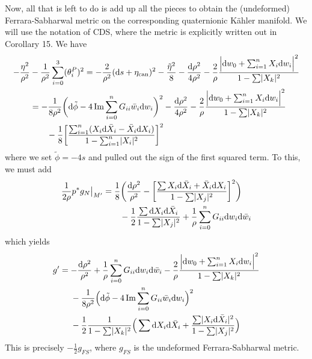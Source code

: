 \documentclass[parskip=half]{scrartcl}
\begin{document}
Now, all that is left to do is add up all the pieces to obtain the (undeformed) Ferrara-Sabharwal metric on the corresponding quaternionic K\"ahler manifold. We will use the notation of CDS, where the metric is explicitly written out in Corollary 15. We have
\begin{align*}
	-\frac{\eta^2}{\rho^2}&-\frac{1}{\rho^2}\sum_{i=0}^3(\theta_i^P)^2
	=-\frac{2}{\rho^2}(\mathrm{d} s+\eta_\text{can})^2-\frac{\tilde\eta^2}{8}-\frac{\mathrm{d} \rho^2}{4\rho^2}
	-\frac{2}{\rho}\frac{\Big|\mathrm{d} w_0 + \sum_{i=1}^n X_i \mathrm{d} w_i\Big|^2}{1-\sum \lvert X_k \rvert^2}\\
	&=-\frac{1}{8\rho^2}\bigg(\mathrm{d} \tilde\phi-4\operatorname{Im} \sum_{i=0}^n G_{ii} \bar w_i \mathrm{d} w_i\bigg)^2
	-\frac{\mathrm{d} \rho^2}{4\rho^2}
	- \frac{2}{\rho}\frac{\Big|\mathrm{d} w_0 + \sum_{i=1}^n X_i \mathrm{d} w_i\Big|^2}{1-\sum \lvert X_k \rvert^2}\\
	&\qquad -\frac{1}{8}\bigg[\frac{\sum_{i=1}^n(X_i \mathrm{d} \bar X_i - \bar X_i \mathrm{d} X_i)}{1-\sum_{i=1}^n\lvert X_i \rvert^2}	\bigg]^2
\end{align*}
where we set $\tilde\phi=-4s$ and pulled out the sign of the first squared term. To this, we must add
\begin{align*}
	\frac{1}{2\rho}p^*g_N\big|_{M'}
	&=\frac{1}{8}\bigg(\frac{\mathrm{d} \rho^2}{\rho^2}
	-\bigg[\frac{\sum X_i \mathrm{d} \bar X_i + \bar X_i \mathrm{d} X_i}{1-\sum \lvert X_j \rvert^2}\bigg]^2\bigg)\\
	&\qquad -\frac{1}{2}\frac{\sum \mathrm{d} X_i \mathrm{d} \bar X_i}{1-\sum \lvert X_j \rvert^2}
	+\frac{1}{\rho}\sum_{i=0}^n G_{ii}\mathrm{d} w_i \mathrm{d} \bar w_i
\end{align*}
which yields
\begin{align*}
	g'&=-\frac{\mathrm{d} \rho^2}{\rho^2}+\frac{1}{\rho}\sum_{i=0}^n G_{ii} \mathrm{d} w_i \mathrm{d} \bar w_i 
	-\frac{2}{\rho}\frac{\Big|\mathrm{d} w_0 + \sum_{i=1}^n X_i \mathrm{d} w_i\Big|^2}{1-\sum \lvert X_k \rvert^2}\\
	&\quad\ -\frac{1}{8\rho^2}\Big(\mathrm{d} \tilde\phi-4\operatorname{Im} \sum_{i=0}^n G_{ii} \bar w_i \mathrm{d} w_i\Big)^2\\
	&\quad\ -\frac{1}{2}\frac{1}{1-\sum \lvert X_k \rvert^2}\Big(\sum \mathrm{d} X_i \mathrm{d} \bar X_i
	+\frac{\sum\lvert X_i \mathrm{d} \bar X_i \rvert^2}{1-\sum \lvert X_j \rvert^2}\Big)
\end{align*}
This is precisely $-\frac{1}{2}g_{FS}$, where $g_{FS}$ is the undeformed Ferrara-Sabharwal metric.
\end{document}
